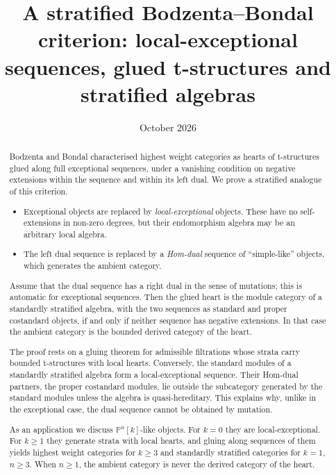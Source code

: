 \documentclass[11pt,reqno]{amsart}
\title[Local-exceptional sequences and stratified algebras]{A stratified Bodzenta--Bondal criterion: local-exceptional sequences, glued t-structures and stratified algebras}
\date{October 2026}
\theoremstyle{plain}
\theoremstyle{definition}
\theoremstyle{remark}
\newcommand{\Pn}[2]{\mathbb{P}^{#1}[#2]}
\begin{document}
\begin{abstract}
Bodzenta and Bondal characterised highest weight categories as hearts of t-structures glued along full exceptional sequences, under a vanishing condition on negative extensions within the sequence and within its left dual. We prove a stratified analogue of this criterion.
\begin{itemize}
\item Exceptional objects are replaced by \emph{local-exceptional} objects. These have no self-extensions in non-zero degrees, but their endomorphism algebra may be an arbitrary local algebra.
\item The left dual sequence is replaced by a \emph{Hom-dual} sequence of ``simple-like'' objects, which generates the ambient category.
\end{itemize}
Assume that the dual sequence has a right dual in the sense of mutations; this is automatic for exceptional sequences. Then the glued heart is the module category of a standardly stratified algebra, with the two sequences as standard and proper costandard objects, if and only if neither sequence has negative extensions. In that case the ambient category is the bounded derived category of the heart.

The proof rests on a gluing theorem for admissible filtrations whose strata carry bounded t-structures with local hearts. Conversely, the standard modules of a standardly stratified algebra form a local-exceptional sequence. Their Hom-dual partners, the proper costandard modules, lie outside the subcategory generated by the standard modules unless the algebra is quasi-hereditary. This explains why, unlike in the exceptional case, the dual sequence cannot be obtained by mutation.

As an application we discuss $\Pn nk$-like objects. For $k=0$ they are local-exceptional. For $k\ge1$ they generate strata with local hearts, and gluing along sequences of them yields highest weight categories for $k\ge3$ and standardly stratified categories for $k=1$, $n\ge3$. When $n\geq1$, the ambient category is never the derived category of the heart.
\end{abstract}

\maketitle

\setcounter{tocdepth}{1}
\tableofcontents

\end{document}
